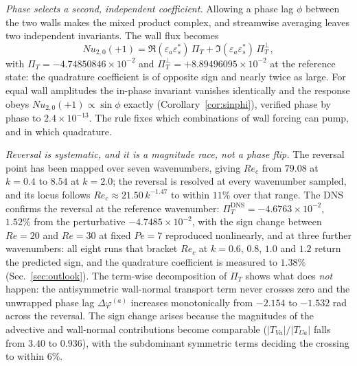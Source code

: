 \documentclass[12pt,a4paper]{article}
\newcommand{\Rey}{\mathit{Re}}
\newcommand{\Pe}{\mathit{Pe}}
\newcommand{\Nu}{\mathit{Nu}}
\newcommand{\PiT}{\Pi_T}
\begin{document}
\emph{Phase selects a second, independent coefficient.} Allowing a phase lag
$\phi$ between the two walls makes the mixed product complex, and streamwise
averaging leaves two independent invariants. The wall flux
becomes
\begin{equation}
\Nu_{2,0}(+1)=\Re(\varepsilon_a\varepsilon_s^{*})\,\PiT
+\Im(\varepsilon_a\varepsilon_s^{*})\,\PiT^{\perp},
\end{equation}
with $\PiT=-4.74850846\times10^{-2}$ and
$\PiT^{\perp}=+8.89496095\times10^{-2}$ at the reference state: the quadrature
coefficient is of opposite sign and nearly twice as large. For equal wall
amplitudes the in-phase invariant vanishes identically and the response obeys
$\Nu_{2,0}(+1)\propto\sin\phi$ exactly (Corollary~\ref{cor:sinphi}), verified phase
by phase to $2.4\times10^{-13}$. The rule fixes which combinations of wall forcing can pump, and in which
quadrature.

\emph{Reversal is systematic, and it is a magnitude race, not a phase flip.}
The reversal point has been mapped over seven wavenumbers, giving
$\Rey_c$ from $79.08$ at $k=0.4$ to $8.54$ at $k=2.0$; the reversal is resolved
at every wavenumber sampled, and its locus follows
$\Rey_c\approx21.50\,k^{-1.47}$ to within $11\%$ over that range. The DNS confirms the reversal at the
reference wavenumber: $\PiT^{\mathrm{DNS}}=-4.6763\times10^{-2}$, $1.52\%$ from
the perturbative $-4.7485\times10^{-2}$, with the sign change between
$\Rey=20$ and $\Rey=30$ at fixed $\Pe=7$ reproduced nonlinearly, and at three
further wavenumbers: all eight runs that bracket $\Rey_c$ at $k=0.6$, $0.8$,
$1.0$ and $1.2$ return the predicted sign, and the quadrature coefficient is
measured to $1.38\%$ (Sec.~\ref{sec:outlook}). The term-wise
decomposition of $\PiT$ shows what does \emph{not} happen: the antisymmetric
wall-normal transport term never crosses zero and the unwrapped phase lag
$\Delta\varphi^{(a)}$ increases monotonically from $-2.154$ to $-1.532$ rad
across the reversal. The sign change arises because the magnitudes of the
advective and wall-normal contributions become comparable
($|T_{Va}|/|T_{Ua}|$ falls from $3.40$ to $0.936$), with the subdominant
symmetric terms deciding the crossing to within $6\%$.
\end{document}
